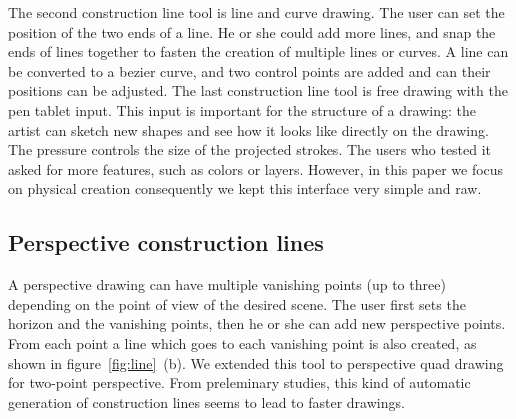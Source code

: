 \documentclass{sigchi}
\begin{document}
    The second construction line tool is line and curve drawing. The
    user can set the position of the two ends of a line. 
    He or she could add more lines, and snap the ends of
    lines together to fasten the creation of multiple lines or curves. 
    A line can be converted to a bezier curve, and two control points
    are added and can their positions can be adjusted.
    The last construction line tool is free drawing with the pen tablet
    input. This input is important for the structure of a drawing: the
    artist can sketch new shapes and see how it looks like directly on
    the drawing. The pressure controls the size of the projected strokes. 
    The users who tested it asked for more features, such as colors or
    layers. However, in this paper we focus on physical creation
    consequently we kept this interface very simple and raw. 




    \subsection{Perspective construction lines}
    




    A perspective drawing can have
    multiple vanishing points (up to three) depending on the point of
    view of the desired scene. 
    The user first sets the horizon and the vanishing points,
    then he or she can add new perspective points. 
    From each point a
    line which goes to each vanishing point is also created, as shown
    in figure~\ref{fig:line}~(b). We extended this tool to perspective
    quad drawing for two-point perspective.  
    From preleminary studies, this kind of automatic generation of
    construction lines seems to lead to faster drawings. 
\end{document}

